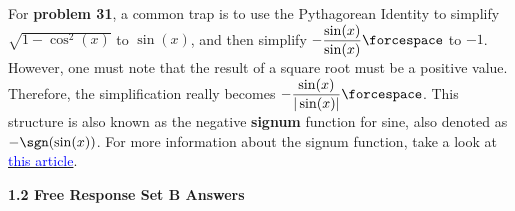 \begin{tcolorbox}[interesting]
    For \textbf{problem 31}, a common trap is to use the Pythagorean Identity to simplify $\sqrt{1 - \cos^2 (x)}$ to $\sin (x)$, and then simplify $-\dfrac{\sin (x)}{\sin (x)} \forcespace$ to $-1$. However, one must note that the result of a square root must be a positive value. Therefore, the simplification really becomes $-\dfrac{\sin (x)}{|\sin (x)|} \forcespace$. This structure is also known as the negative \textbf{signum} function for sine, also denoted as $-\sgn(\sin (x))$. For more information about the signum function, take a look at \href{https://en.wikipedia.org/wiki/Sign_function}{\textcolor{blue}{this article}}.
\end{tcolorbox} \vspace{11pt}

\textbf{\large{1.2 Free Response Set B Answers}} \par

